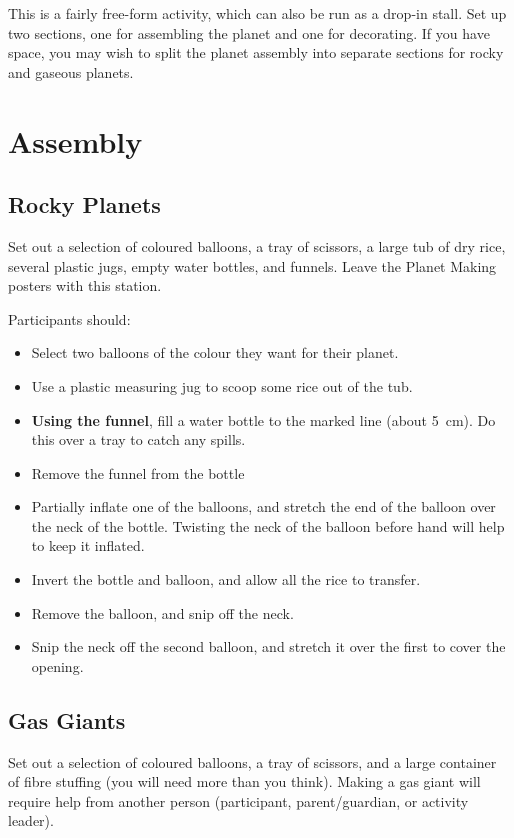 \documentclass{article}
\begin{document}
This is a fairly free-form activity, which can also be run as a drop-in stall.
Set up two sections, one for assembling the planet and one for decorating. If
you have space, you may wish to split the planet assembly into separate sections
for rocky and gaseous planets.

\section{Assembly}

\subsection{Rocky Planets}

Set out a selection of coloured balloons, a tray of scissors, a large tub of dry
rice, several plastic jugs, empty water bottles, and funnels. Leave the Planet
Making posters with this station.

Participants should:
\begin{itemize}
    \item Select two balloons of the colour they want for their planet.
    \item Use a plastic measuring jug to scoop some rice out of the tub.
    \item \textbf{Using the funnel}, fill a water bottle to the marked line
    (about \SI{5}{\centi\meter}). Do this over a tray to catch any spills.
    \item Remove the funnel from the bottle
    \item Partially inflate one of the balloons, and stretch the end of the
    balloon over the neck of the bottle. Twisting the neck of the balloon before
    hand will help to keep it inflated.
    \item Invert the bottle and balloon, and allow all the rice to transfer.
    \item Remove the balloon, and snip off the neck. 
    \item Snip the neck off the second balloon, and stretch it over the first to
    cover the opening.
\end{itemize}

\subsection{Gas Giants}

Set out a selection of coloured balloons, a tray of scissors, and a large
container of fibre stuffing (you will need more than you think). Making a gas
giant will require help from another person (participant, parent/guardian, or
activity leader).
\end{document}
